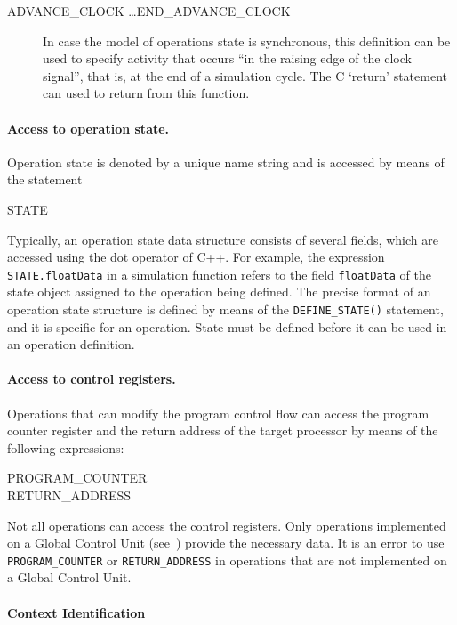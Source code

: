 \documentclass[twoside]{tceusermanual}
\begin{document}
\begin{description}
\item[ADVANCE\_CLOCK \ldots END\_ADVANCE\_CLOCK]%
  In case the model of operations state is synchronous, this definition can
  be used to specify activity that occurs ``in the raising edge of the clock
  signal'', that is, at the end of a simulation cycle. The C `return'
  statement can used to return from this function.
\end{description}

\paragraph{Access to operation state.}
Operation state is denoted by a unique name string and is accessed by means
of the statement
\begin{description}
\item[STATE]
\end{description}

Typically, an operation state data structure consists of several fields,
which are accessed using the dot operator of C++.  For example, the
expression \verb#STATE.floatData# in a simulation function refers to the
field \verb#floatData# of the state object assigned to the operation
being defined.  The precise format of an
operation state structure is defined by means of the \verb#DEFINE_STATE()#
statement, and it is specific for an operation. State must be defined before it
can be used in an operation definition.

\paragraph{Access to control registers.}
Operations that can modify the program control flow can access the program
counter register and the return address of the target processor by means of
the following expressions:
\begin{description}
\item[PROGRAM\_COUNTER] %
\item[RETURN\_ADDRESS] %
\end{description}
Not all operations can access the control registers.  Only operations
implemented on a Global Control Unit (see~\cite{ADF-specs}) provide the
necessary data.  It is an error to use \verb#PROGRAM_COUNTER# or
\verb#RETURN_ADDRESS# in operations that are not implemented on a Global
Control Unit.

\paragraph{Context Identification}
\end{document}
